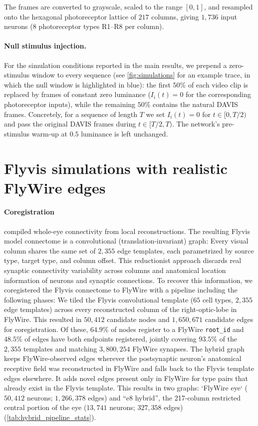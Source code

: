 \documentclass{article}
\begin{document}
The frames are converted to grayscale, scaled to the range $[0, 1]$,
and resampled onto the hexagonal photoreceptor lattice of $217$ columns,
giving $1{,}736$ input neurons ($8$ photoreceptor types R1--R8 per
column).

\paragraph{Null stimulus injection.}
For the simulation conditions reported in the main results, we prepend
a zero-stimulus window to every sequence (see \cref{fig:simulations}
for an example trace, in which the null window is highlighted in
blue): the first $50\%$ of each video clip is replaced by frames of
constant zero luminance ($I_i(t)=0$ for the corresponding photoreceptor
inputs), while the remaining $50\%$ contains the natural DAVIS frames.
Concretely, for a sequence of length $T$ we set $I_i(t)=0$ for
$t \in [0, T/2)$ and pass the original DAVIS frames during
$t \in [T/2, T)$. The network's pre-stimulus warm-up at $0.5$
luminance is left unchanged.


\section{Flyvis simulations with realistic FlyWire edges}
\label{app:flywire}

\paragraph{Coregistration}

\citet{lappalainen_connectome-constrained_2024} 
compiled whole-eye connectivity from local reconstructions.
The resulting Flyvis model connectome is a convolutional (translation-invariant) graph: Every visual column shares the same set of $2,355$ edge templates, each parametrized by source type, target type, and column offset.
This reductionist approach discards real synaptic connectivity variability across columns and anatomical location information of neurons and synaptic connections.
To recover this information, we coregistered the Flyvis connectome to FlyWire with a pipeline including the following phases:
We tiled the Flyvis convolutional template ($65$ cell types, $2{,}355$ edge templates) across every reconstructed column of the right-optic-lobe in FlyWire. This resulted in $50{,}412$ candidate nodes and $1{,}650{,}671$ candidate edges for coregistration. Of these, $64.9\%$ of nodes register to a FlyWire \texttt{root\_id} and $48.5\%$ of edges have both endpoints registered, jointly covering $93.5\%$ of the $2{,}355$ templates and matching $3{,}800{,}254$ FlyWire synapses. The hybrid graph keeps FlyWire-observed edges wherever the postsynaptic neuron's anatomical receptive field was reconstructed in FlyWire and falls back to the Flyvis template edges elsewhere. It adds novel edges present only in FlyWire for type pairs that already exist in the Flyvis template. This results in two graphs: `FlyWire eye` ($50{,}412$ neurons; $1{,}266{,}378$ edges) and ``e8 hybrid'', the 217-column restricted central portion of the eye ($13{,}741$ neurons; $327{,}358$ edges) (\cref{tab:hybrid_pipeline_stats}).  
\end{document}
